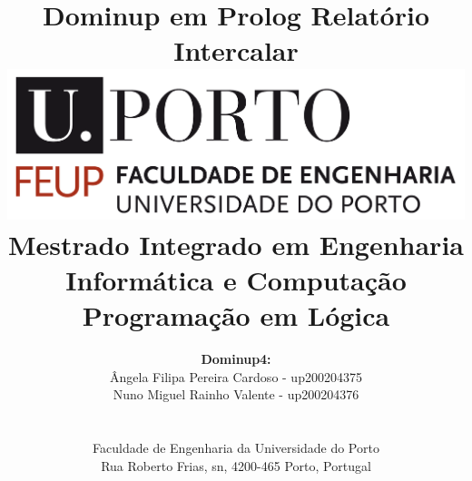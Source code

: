 \documentclass[a4paper]{article}
\begin{document}

\title{\Huge\textbf{Dominup em Prolog}\linebreak\linebreak\linebreak
\Large\textbf{Relatório Intercalar}\linebreak\linebreak
\linebreak\linebreak
\includegraphics[scale=0.1]{feup-logo.png}\linebreak\linebreak
\linebreak\linebreak
\Large{Mestrado Integrado em Engenharia Informática e Computação} \linebreak\linebreak
\Large{Programação em Lógica}\linebreak
}

\author{\textbf{Dominup4:}\\
Ângela Filipa Pereira Cardoso - up200204375 \\
Nuno Miguel Rainho Valente - up200204376 \\
\linebreak\linebreak \\
 \\ Faculdade de Engenharia da Universidade do Porto \\ Rua Roberto Frias, s\/n, 4200-465 Porto, Portugal \linebreak\linebreak\linebreak
\linebreak\linebreak\vspace{1cm}}

\maketitle
\thispagestyle{empty}
\end{document}
